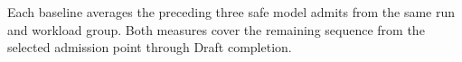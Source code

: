 \begin{table}[!b]
  \par\vspace{2pt}
  \begin{minipage}{\columnwidth}
  \raggedright\scriptsize
  Each baseline averages the preceding three safe model admits from the same
  run and workload group. Both measures cover the remaining sequence from the
  selected admission point through Draft completion.
  \end{minipage}
\end{table}
